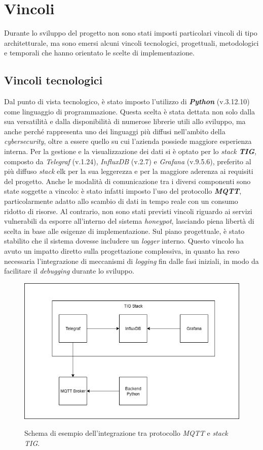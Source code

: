 \section{Vincoli}
Durante lo sviluppo del progetto non sono stati imposti particolari vincoli di tipo architetturale, ma sono emersi alcuni vincoli tecnologici, progettuali, metodologici e temporali che hanno orientato le scelte di implementazione. 
\subsection{Vincoli tecnologici}
Dal punto di vista tecnologico, è stato imposto l'utilizzo di \textbf{\textit{Python}} (v.3.12.10) come linguaggio di programmazione. Questa scelta è stata dettata non solo dalla sua versatilità e dalla disponibilità di numerose librerie utili allo sviluppo, ma anche perché rappresenta uno dei linguaggi più diffusi nell'ambito della \textit{cybersecurity}, oltre a essere quello su cui l'azienda possiede maggiore esperienza interna. Per la gestione e la visualizzazione dei dati si è optato per lo \textit{stack \textbf{TIG}}, composto da \textit{Telegraf} (v.1.24), \textit{InfluxDB} (v.2.7) e \textit{Grafana} (v.9.5.6), preferito al più diffuso \textit{stack} \gls{elk} per la sua leggerezza e per la maggiore aderenza ai requisiti del progetto. Anche le modalità di comunicazione tra i diversi componenti sono state soggette a vincolo: è stato infatti imposto l'uso del protocollo \textit{\textbf{MQTT}}, particolarmente adatto allo scambio di dati in tempo reale con un consumo ridotto di risorse. Al contrario, non sono stati previsti vincoli riguardo ai servizi vulnerabili da esporre all'interno del sistema \textit{honeypot}, lasciando piena libertà di scelta in base alle esigenze di implementazione. 
Sul piano progettuale, è stato stabilito che il sistema dovesse includere un \textit{logger} interno. Questo vincolo ha avuto un impatto diretto sulla progettazione complessiva, in quanto ha reso necessaria l'integrazione di meccanismi di \textit{logging} fin dalle fasi iniziali, in modo da facilitare il \textit{debugging} durante lo sviluppo.
\begin{figure}[H]
    \centering
    \includegraphics[alt={Schema MQTT-TIG}, width=\columnwidth]{img/mqtt-tig.png}
    \caption{Schema di esempio dell'integrazione tra protocollo \textit{MQTT} e \textit{stack} \textit{TIG}.}
    \label{fig:mqtt-tig}
\end{figure}
